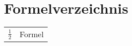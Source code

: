 \chapter*{Formelverzeichnis}

\thispagestyle{fancy}

\begin{longtable}{p{3 cm}p{10 cm}}
$ \frac{1}{2} $ \hspace{0.1cm} \dotfill&Formel  \\
\end{longtable}
